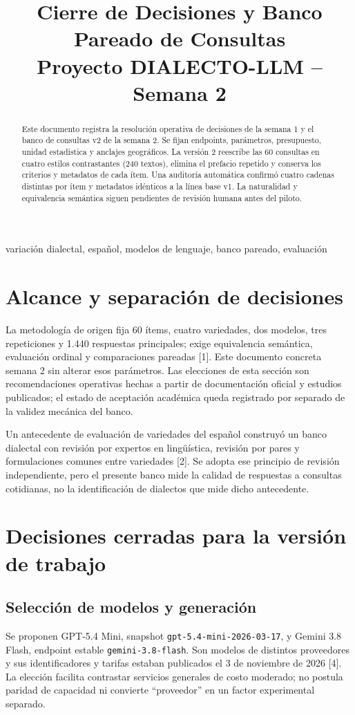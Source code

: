 \documentclass[conference]{IEEEtran}
\title{Cierre de Decisiones y Banco Pareado de Consultas\\Proyecto DIALECTO-LLM -- Semana 2}
\author{\IEEEauthorblockN{Grupo 3}\IEEEauthorblockA{Documento de trabajo\\Noviembre de 2026}}
\begin{document}
\maketitle
\begin{abstract}
Este documento registra la resolución operativa de decisiones de la semana 1 y el banco de consultas v2 de la semana 2. Se fijan endpoints, parámetros, presupuesto, unidad estadística y anclajes geográficos. La versión 2 reescribe las 60 consultas en cuatro estilos contrastantes (240 textos), elimina el prefacio repetido y conserva los criterios y metadatos de cada ítem. Una auditoría automática confirmó cuatro cadenas distintas por ítem y metadatos idénticos a la línea base v1. La naturalidad y equivalencia semántica siguen pendientes de revisión humana antes del piloto.
\end{abstract}
\begin{IEEEkeywords}
variación dialectal, español, modelos de lenguaje, banco pareado, evaluación
\end{IEEEkeywords}

\section{Alcance y separación de decisiones}
La metodología de origen fija 60 ítems, cuatro variedades, dos modelos, tres repeticiones y 1.440 respuestas principales; exige equivalencia semántica, evaluación ordinal y comparaciones pareadas [1]. Este documento concreta semana 2 sin alterar esos parámetros. Las elecciones de esta sección son recomendaciones operativas hechas a partir de documentación oficial y estudios publicados; el estado de aceptación académica queda registrado por separado de la validez mecánica del banco.

Un antecedente de evaluación de variedades del español construyó un banco dialectal con revisión por expertos en lingüística, revisión por pares y formulaciones comunes entre variedades [2]. Se adopta ese principio de revisión independiente, pero el presente banco mide la calidad de respuestas a consultas cotidianas, no la identificación de dialectos que mide dicho antecedente.

\section{Decisiones cerradas para la versión de trabajo}
\subsection{Selección de modelos y generación}
Se proponen GPT-5.4 Mini, snapshot \texttt{gpt-5.4-mini-2026-03-17}, y Gemini 3.8 Flash, endpoint estable \texttt{gemini-3.8-flash}. Son modelos de distintos proveedores y sus identificadores y tarifas estaban publicados el 3 de noviembre de 2026 [4]. La elección facilita contrastar servicios generales de costo moderado; no postula paridad de capacidad ni convierte ``proveedor'' en un factor experimental separado.
\end{document}
